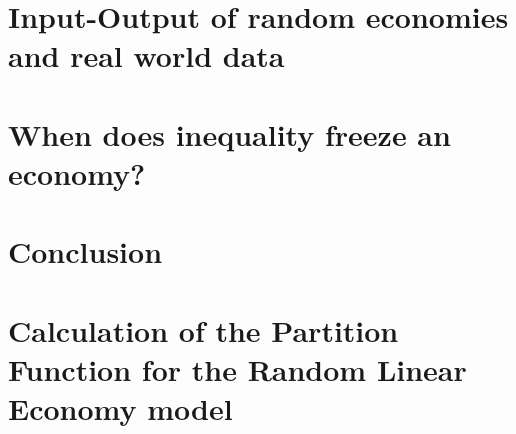\documentclass[
  oneside,
  11pt, a4paper,
  footinclude=true,
  headinclude=true,
  cleardoublepage=empty,
]{scrbook}
\begin{document}
\chapter{Input-Output of random economies and real world data}

\chapter{When does inequality freeze an economy?}



\chapter{Conclusion}

\appendix

\chapter{Calculation of the Partition Function for the Random Linear
  Economy model} \label{sec:appendix_replica}



{}

    
\end{document}
